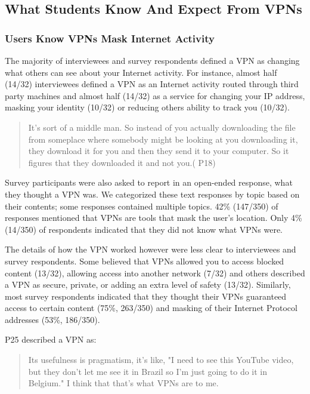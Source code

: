 \subsection{What Students Know And Expect From VPNs}

\subsubsection{Users Know VPNs Mask Internet Activity}

The majority of interviewees and survey respondents defined a VPN as changing what others can see about your Internet activity. For instance, almost half (14/32) interviewees defined a VPN as an
Internet activity routed through third party machines and almost half (14/32) as a service for changing your IP
address, masking your identity (10/32) or reducing others ability to track
you (10/32).  \begin{quote}It's sort of a middle man. So instead of you actually
downloading the file from someplace where somebody might be looking at you
downloading it, they download it for you and then they send it to your
computer. So it figures that they downloaded it and not you.( P18)\end{quote}

Survey participants were also asked to report in an open-ended response, what they
thought a VPN was. We categorized these text responses by topic based on their
contents; some responses contained multiple topics.   42\% (147/350) of
responses mentioned that VPNs are tools that mask the user’s location. Only
4\% (14/350) of respondents indicated that they did not know what VPNs were.

The details of how the VPN worked however were less clear to interviewees and survey respondents. Some believed that VPNs allowed you to  access blocked content (13/32), allowing access into another network (7/32) and others described a VPN as secure,  private, or adding an extra level of safety (13/32). Similarly, most survey respondents indicated that they thought their VPNs guaranteed access to certain content
 (75\%, 263/350) and masking of their Internet Protocol addresses (53\%, 186/350).


P25 described a VPN as:
\begin{quote} Its usefulness is pragmatism, it's like, "I need to see this YouTube video, but they don't let me see it in Brazil so I'm just going to do it
    in Belgium." I think that that's what VPNs are to me. \end{quote}
    
